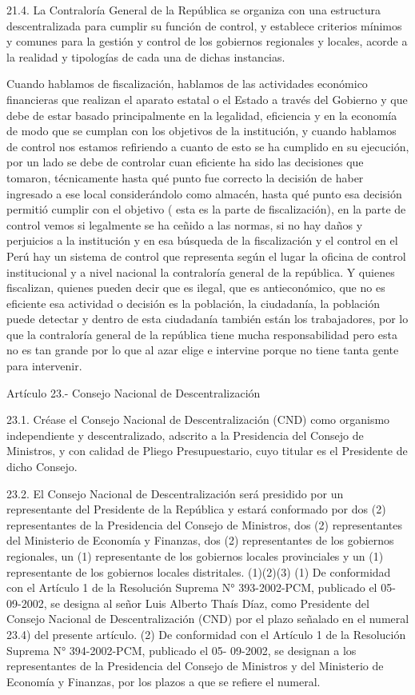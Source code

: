 \documentclass[
  letterpaper,
  DIV=11,
  numbers=noendperiod]{scrartcl}
\begin{document}
21.4. La Contraloría General de la República se organiza con una
estructura descentralizada para cumplir su función de control, y
establece criterios mínimos y comunes para la gestión y control de los
gobiernos regionales y locales, acorde a la realidad y tipologías de
cada una de dichas instancias.

Cuando hablamos de fiscalización, hablamos de las actividades económico
financieras que realizan el aparato estatal o el Estado a través del
Gobierno y que debe de estar basado principalmente en la legalidad,
eficiencia y en la economía de modo que se cumplan con los objetivos de
la institución, y cuando hablamos de control nos estamos refiriendo a
cuanto de esto se ha cumplido en su ejecución, por un lado se debe de
controlar cuan eficiente ha sido las decisiones que tomaron,
técnicamente hasta qué punto fue correcto la decisión de haber ingresado
a ese local considerándolo como almacén, hasta qué punto esa decisión
permitió cumplir con el objetivo ( esta es la parte de fiscalización),
en la parte de control vemos si legalmente se ha ceñido a las normas, si
no hay daños y perjuicios a la institución y en esa búsqueda de la
fiscalización y el control en el Perú hay un sistema de control que
representa según el lugar la oficina de control institucional y a nivel
nacional la contraloría general de la república. Y quienes fiscalizan,
quienes pueden decir que es ilegal, que es antieconómico, que no es
eficiente esa actividad o decisión es la población, la ciudadanía, la
población puede detectar y dentro de esta ciudadanía también están los
trabajadores, por lo que la contraloría general de la república tiene
mucha responsabilidad pero esta no es tan grande por lo que al azar
elige e intervine porque no tiene tanta gente para intervenir.

Artículo 23.- Consejo Nacional de Descentralización

23.1. Créase el Consejo Nacional de Descentralización (CND) como
organismo independiente y descentralizado, adscrito a la Presidencia del
Consejo de Ministros, y con calidad de Pliego Presupuestario, cuyo
titular es el Presidente de dicho Consejo.

23.2. El Consejo Nacional de Descentralización será presidido por un
representante del Presidente de la República y estará conformado por dos
(2) representantes de la Presidencia del Consejo de Ministros, dos (2)
representantes del Ministerio de Economía y Finanzas, dos (2)
representantes de los gobiernos regionales, un (1) representante de los
gobiernos locales provinciales y un (1) representante de los gobiernos
locales distritales. (1)(2)(3) (1) De conformidad con el Artículo 1 de
la Resolución Suprema N° 393-2002-PCM, publicado el 05- 09-2002, se
designa al señor Luis Alberto Thaís Díaz, como Presidente del Consejo
Nacional de Descentralización (CND) por el plazo señalado en el numeral
23.4) del presente artículo. (2) De conformidad con el Artículo 1 de la
Resolución Suprema N° 394-2002-PCM, publicado el 05- 09-2002, se
designan a los representantes de la Presidencia del Consejo de Ministros
y del Ministerio de Economía y Finanzas, por los plazos a que se refiere
el numeral.
\end{document}

